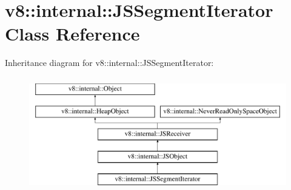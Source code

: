 \hypertarget{classv8_1_1internal_1_1JSSegmentIterator}{}\section{v8\+:\+:internal\+:\+:J\+S\+Segment\+Iterator Class Reference}
\label{classv8_1_1internal_1_1JSSegmentIterator}
Inheritance diagram for v8\+:\+:internal\+:\+:J\+S\+Segment\+Iterator\+:\begin{figure}[H]
\begin{center}
\leavevmode
\includegraphics[height=5.000000cm]{classv8_1_1internal_1_1JSSegmentIterator}
\end{center}
\end{figure}

